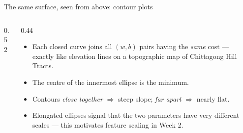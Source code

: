 \documentclass[aspectratio=169,11pt]{beamer}
\begin{document}
\begin{frame}{The same surface, seen from above: contour plots}
  \begin{columns}[T,onlytextwidth]
    \begin{column}{0.52\textwidth}
      \centering
    \end{column}
    \begin{column}{0.44\textwidth}
      \small
      \begin{itemize}
        \item Each closed curve joins all $(w,b)$ pairs having the \emph{same}
              cost --- exactly like elevation lines on a topographic map of
              Chittagong Hill Tracts.
        \item The centre of the innermost ellipse is the minimum.
        \item Contours \emph{close together} $\Rightarrow$ steep slope;
              \emph{far apart} $\Rightarrow$ nearly flat.
        \item Elongated ellipses signal that the two parameters have very
              different scales --- this motivates feature scaling in Week 2.
      \end{itemize}
    \end{column}
  \end{columns}
\end{frame}
\end{document}
